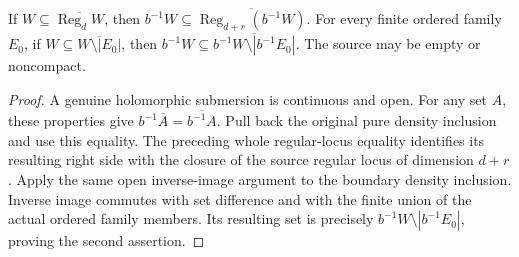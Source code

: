 \begin{theorem}
\label{hir:original-smooth-intrinsic-pure-boundary-density}
\leanok
If $W\subseteq\overline{\operatorname{Reg}_d W}$, then
$b^{-1}W\subseteq\overline{\operatorname{Reg}_{d+r}(b^{-1}W)}$.
For every finite ordered family $E_0$, if
$W\subseteq\overline{W\setminus|E_0|}$, then
$b^{-1}W\subseteq\overline{b^{-1}W\setminus|b^{-1}E_0|}$.
The source may be empty or noncompact.
\end{theorem}
\begin{proof}
A genuine holomorphic submersion is continuous and open.  For any set
$A$, these properties give
$b^{-1}\overline A=\overline{b^{-1}A}$.  Pull back the original pure
density inclusion and use this equality.  The preceding whole
regular-locus equality identifies its resulting right side with the
closure of the source regular locus of dimension $d+r$.  Apply the same
open inverse-image argument to the boundary density inclusion.
Inverse image commutes with set difference and with the finite union
of the actual ordered family members.  Its resulting set is precisely
$b^{-1}W\setminus|b^{-1}E_0|$, proving the second assertion.
\end{proof}

